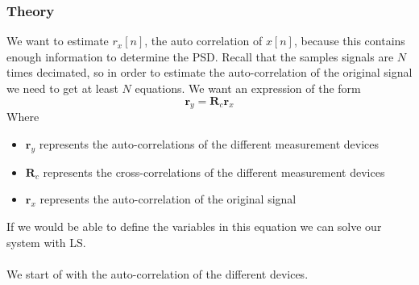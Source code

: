 \documentclass[report, oneside, a4paper, openany]{memoir}
\begin{document}
\subsubsection{Theory}
We want to estimate $r_x[n]$, the auto correlation of $x[n]$, because this contains enough information to determine the PSD.
Recall that the samples signals are $N$ times decimated, so in order to estimate the auto-correlation of the original signal we need to get at least $N$ equations. 
We want an expression of the form
$$
\mathbf{r}_y = \mathbf{R}_c\mathbf{r}_x
$$ 
Where
\begin{itemize}
\item $\mathbf{r}_y$ represents the auto-correlations of the different measurement devices
\item $\mathbf{R}_c$ represents the cross-correlations of the different measurement devices 
\item $\mathbf{r}_x$ represents the auto-correlation of the original signal
\end{itemize}
If we would be able to define the variables in this equation we can solve our system with LS.\\
\\
We start of with the auto-correlation of the different devices.
\end{document}
